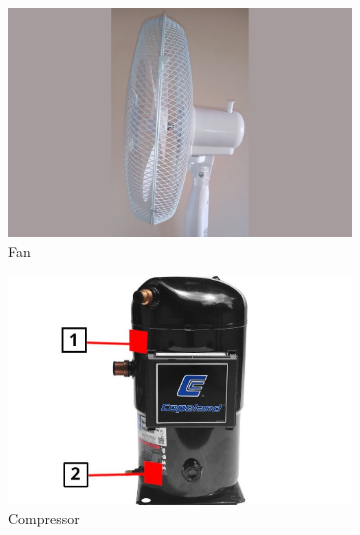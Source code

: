 \begin{figure}[h]
    \centering
    \begin{subfigure}[b]{0.49\textwidth}
    		\centering
        \includegraphics[width=\textwidth]{assets/design/sensor/standing-fan.jpg}
        \caption{\footnotesize Fan}
        \label{fig:machine:fan}
    \end{subfigure}
    \hfill
    \begin{subfigure}[b]{0.49\textwidth}
    		\centering
        \includegraphics[width=\textwidth]{assets/design/sensor/compressor.jpg}
        \caption{\footnotesize Compressor}
        \label{fig:machine:compressor}
    \end{subfigure}
    \hfill
    \begin{subfigure}[b]{0.49\textwidth}
    		\centering

\end{subfigure}
\end{figure}
